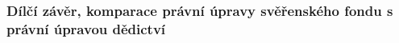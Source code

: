 \documentclass{article}
\begin{document}


\subsubsection{Dílčí závěr, komparace právní úpravy svěřenského fondu s právní úpravou dědictví}
\end{document}
